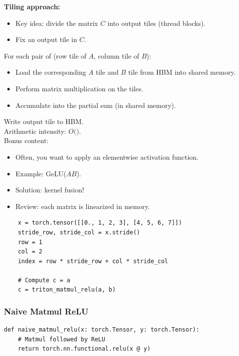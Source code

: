 \documentclass[12pt,twoside]{article}
\begin{document}
\textbf{Tiling approach:}

\begin{itemize}
    \item Key idea: divide the matrix \(C\) into output tiles (thread blocks).
    \item Fix an output tile in \(C\).
\end{itemize}

For each pair of (row tile of \(A\), column tile of \(B\)):

\begin{itemize}
    \item Load the corresponding \(A\) tile and \(B\) tile from HBM into shared memory.
    \item Perform matrix multiplication on the tiles.
    \item Accumulate into the partial sum (in shared memory).
\end{itemize}

Write output tile to HBM. \\

Arithmetic intensity: \(O(\)\()\). \\

Bonus content:

\begin{itemize}
    \item Often, you want to apply an elementwise activation function.
    \item Example: GeLU(\(AB\)).
    \item Solution: kernel fusion!
    \item Review: each matrix is linearized in memory.
\end{itemize}

\begin{verbatim}
    x = torch.tensor([[0., 1, 2, 3], [4, 5, 6, 7]])  
    stride_row, stride_col = x.stride()  
    row = 1
    col = 2
    index = row * stride_row + col * stride_col  
    
    # Compute c = a 
    c = triton_matmul_relu(a, b)
\end{verbatim}

\subsubsection*{Naive Matmul ReLU}

\begin{verbatim}
def naive_matmul_relu(x: torch.Tensor, y: torch.Tensor):
    # Matmul followed by ReLU
    return torch.nn.functional.relu(x @ y)
\end{verbatim}
\end{document}

